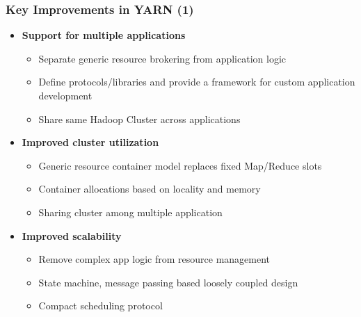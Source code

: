 \begin{frame}
\frametitle{Key Improvements in YARN (1)}
\begin{itemize}
  \item {\bf Support for multiple applications}
  \begin{itemize}
    \item Separate generic resource brokering from application logic
    \item Define protocols/libraries and provide a framework for custom application development
    \item Share same Hadoop Cluster across applications
  \end{itemize}

\vspace{10pt}

  \item {\bf Improved cluster utilization}
  \begin{itemize}
    \item Generic resource container model replaces fixed Map/Reduce slots
    \item Container allocations based on locality and memory
    \item Sharing cluster among multiple application
  \end{itemize}

\vspace{10pt}

  \item {\bf Improved scalability}
  \begin{itemize}
    \item Remove complex app logic from resource management
    \item State machine, message passing based loosely coupled design
    \item Compact scheduling protocol
  \end{itemize}
\end{itemize}
\end{frame}

